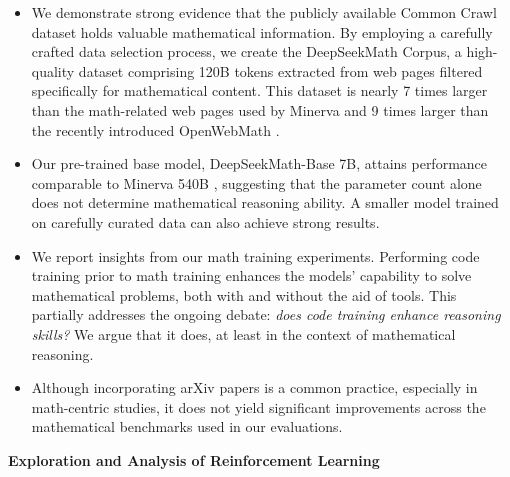 \begin{itemize}[topsep=0pt]
    \item We demonstrate strong evidence that the publicly available Common Crawl dataset holds valuable mathematical information. By employing a carefully crafted data selection process, we create the DeepSeekMath Corpus, a high-quality dataset comprising 120B tokens extracted from web pages filtered specifically for mathematical content. This dataset is nearly 7 times larger than the math-related web pages used by Minerva \citep{minerva} and 9 times larger than the recently introduced OpenWebMath \citep{openwebmath}.

    \item Our pre-trained base model, DeepSeekMath-Base 7B, attains performance comparable to Minerva 540B \citep{minerva}, suggesting that the parameter count alone does not determine mathematical reasoning ability. A smaller model trained on carefully curated data can also achieve strong results.

    \item We report insights from our math training experiments. Performing code training prior to math training enhances the models' capability to solve mathematical problems, both with and without the aid of tools. This partially addresses the ongoing debate: \textit{does code training enhance reasoning skills?} We argue that it does, at least in the context of mathematical reasoning.

    \item Although incorporating arXiv papers is a common practice, especially in math-centric studies, it does not yield significant improvements across the mathematical benchmarks used in our evaluations.
\end{itemize}

\textbf{Exploration and Analysis of Reinforcement Learning}

